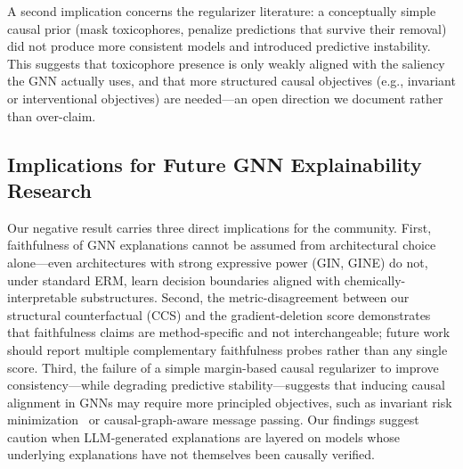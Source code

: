 \documentclass[a4paper,fleqn]{cas-dc}
\begin{document}
A second implication concerns the regularizer literature: a conceptually simple causal prior (mask toxicophores, penalize predictions that survive their removal) did not produce more consistent models and introduced predictive instability. This suggests that toxicophore presence is only weakly aligned with the saliency the GNN actually uses, and that more structured causal objectives (e.g., invariant or interventional objectives) are needed---an open direction we document rather than over-claim.

\subsection*{Implications for Future GNN Explainability Research}
Our negative result carries three direct implications for the community.
First, faithfulness of GNN explanations cannot be assumed from architectural
choice alone---even architectures with strong expressive power (GIN, GINE)
do not, under standard ERM, learn decision boundaries aligned with
chemically-interpretable substructures. Second, the metric-disagreement
between our structural counterfactual (CCS) and the gradient-deletion score
demonstrates that faithfulness claims are method-specific and
not interchangeable; future work should report multiple complementary
faithfulness probes rather than any single score. Third, the failure of a
simple margin-based causal regularizer to improve consistency---while
degrading predictive stability---suggests that inducing causal alignment
in GNNs may require more principled objectives, such as invariant risk
minimization~\cite{arjovsky2019invariant} or causal-graph-aware message
passing. Our findings suggest caution when LLM-generated explanations are
layered on models whose underlying explanations have not themselves been
causally verified.
\end{document}
